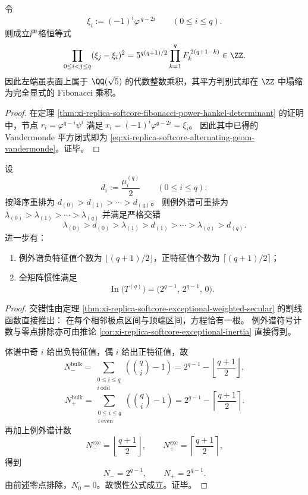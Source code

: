 \begin{corollary}\label{cor:xi-replica-softcore-alternating-geom-vandermonde}
令
\[
\xi_i:=(-1)^i\varphi^{\,q-2i}\qquad(0\le i\le q).
\]
则成立严格恒等式
\begin{equation}\label{eq:xi-replica-softcore-alternating-geom-vandermonde}
\prod_{0\le i<j\le q}(\xi_j-\xi_i)^2
=5^{q(q+1)/2}\prod_{k=1}^{q}F_k^{\,2(q+1-k)}\in\ZZ.
\end{equation}
因此左端虽表面上属于 \(\QQ(\sqrt5)\) 的代数整数乘积，其平方判别式却在 \(\ZZ\) 中塌缩为完全显式的 Fibonacci 乘积。
\end{corollary}
\begin{proof}
在定理 \ref{thm:xi-replica-softcore-fibonacci-power-hankel-determinant} 的证明中，节点 \(r_i=\varphi^{q-i}\psi^i\) 满足
\(
r_i=(-1)^i\varphi^{q-2i}=\xi_i
\)。
因此其中已得的 Vandermonde 平方闭式即为 \eqref{eq:xi-replica-softcore-alternating-geom-vandermonde}。证毕。
\end{proof}

\begin{theorem}[严格交错与全矩阵惯性平衡]\label{thm:xi-replica-softcore-full-inertia-balance}
设
\[
d_i:=\frac{\mu_i^{(q)}}2\qquad(0\le i\le q),
\]
按降序重排为
\(
d_{(0)}>d_{(1)}>\cdots>d_{(q)}
\)。
则例外谱可重排为
\(
\lambda_{(0)}>\lambda_{(1)}>\cdots>\lambda_{(q)}
\)
并满足严格交错
\[
\lambda_{(0)}>d_{(0)}>\lambda_{(1)}>d_{(1)}>\cdots>\lambda_{(q)}>d_{(q)}.
\]
进一步有：
\begin{enumerate}
  \item 例外谱负特征值个数为 \(\lfloor(q+1)/2\rfloor\)，正特征值个数为 \(\lceil(q+1)/2\rceil\)；
  \item 全矩阵惯性满足
  \[
  \operatorname{In}\!\bigl(T^{(q)}\bigr)=\bigl(2^{q-1},\,2^{q-1},\,0\bigr).
  \]
\end{enumerate}
\end{theorem}
\begin{proof}
交错性由定理 \ref{thm:xi-replica-softcore-exceptional-weighted-secular} 的割线函数直接推出：
在每个相邻极点区间与顶端区间，方程恰有一根。
例外谱符号计数与零点排除亦可由推论 \ref{cor:xi-replica-softcore-exceptional-inertia} 直接得到。

体谱中奇 \(i\) 给出负特征值，偶 \(i\) 给出正特征值，故
\[
N_-^{\mathrm{bulk}}
=
\sum_{\substack{0\le i\le q\\ i\ \mathrm{odd}}}
\left(\binom qi-1\right)
=
2^{q-1}-\left\lfloor\frac{q+1}{2}\right\rfloor,
\]
\[
N_+^{\mathrm{bulk}}
=
\sum_{\substack{0\le i\le q\\ i\ \mathrm{even}}}
\left(\binom qi-1\right)
=
2^{q-1}-\left\lceil\frac{q+1}{2}\right\rceil.
\]
再加上例外谱计数
\[
N_-^{\mathrm{exc}}=\left\lfloor\frac{q+1}{2}\right\rfloor,\qquad
N_+^{\mathrm{exc}}=\left\lceil\frac{q+1}{2}\right\rceil,
\]
得到
\[
N_-=2^{q-1},\qquad N_+=2^{q-1}.
\]
由前述零点排除，\(N_0=0\)。故惯性公式成立。证毕。
\end{proof}

